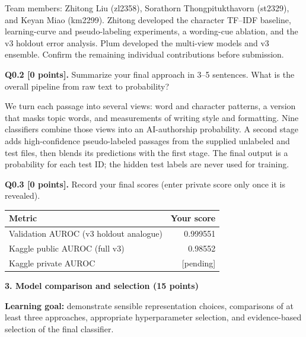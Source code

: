 \documentclass[11pt,letterpaper]{article}
\begin{document}
Team members: Zhitong Liu (zl2358), Sorathorn Thongpitukthavorn (st2329), and Keyan Miao (km2299). Zhitong developed the character TF--IDF baseline, learning-curve and pseudo-labeling experiments, a wording-cue ablation, and the v3 holdout error analysis. Plum developed the multi-view models and v3 ensemble. Confirm the remaining individual contributions before submission.

\newpage

\textbf{Q0.2 [0 points].} Summarize your final approach in 3--5 sentences. What is the overall pipeline from raw text to probability?

We turn each passage into several views: word and character patterns, a version that masks topic words, and measurements of writing style and formatting. Nine classifiers combine those views into an AI-authorship probability. A second stage adds high-confidence pseudo-labeled passages from the supplied unlabeled and test files, then blends its predictions with the first stage. The final output is a probability for each test ID; the hidden test labels are never used for training.

\vspace{14pt}
\textbf{Q0.3 [0 points].} Record your final scores (enter private score only once it is revealed).

\vspace{4pt}
\begin{tabularx}{0.65\textwidth}{@{}Xr@{}}
\toprule
\textbf{Metric} & \textbf{Your score} \\
\midrule
Validation AUROC (v3 holdout analogue) & 0.999551 \\
Kaggle public AUROC (full v3) & 0.98552 \\
Kaggle private AUROC & [pending] \\
\bottomrule
\end{tabularx}

\newpage

{\large\textbf{3. Model comparison and selection (15 points)}}
\vspace{2pt}

\textbf{Learning goal:} demonstrate sensible representation choices, comparisons of at least three approaches, appropriate hyperparameter selection, and evidence-based selection of the final classifier.
\end{document}
